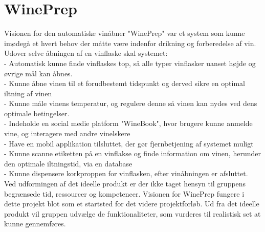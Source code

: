 \section{WinePrep}
Visionen for den automatiske vinåbner "WinePrep" var et system som kunne imødegå et hvert behov der måtte være indenfor drikning og forberedelse af vin. \\
Udover selve åbningen af en vinflaske skal systemet:\\
- Automatisk kunne finde vinflaskes top, så alle typer vinflasker uanset højde og øvrige mål kan åbnes.\\ 
- Kunne åbne vinen til et forudbestemt tidspunkt og derved sikre en optimal iltning af vinen\\
- Kunne måle vinens temperatur, og regulere denne så vinen kan nydes ved dens optimale betingelser.\\
- Indeholde en social medie platform "WineBook", hvor brugere kunne anmelde vine, og interagere med andre vinelskere\\
- Have en mobil applikation tilsluttet, der gør fjernbetjening af systemet muligt\\
- Kunne scanne etiketten på en vinflakse og finde information om vinen, herunder den optimale iltningstid, via en database\\
- Kunne dispensere korkproppen for vinflasken, efter vinåbningen er afsluttet.\\

Ved udformingen af det ideelle produkt er der ikke taget hensyn til gruppens begrænsede tid, ressourcer og kompetencer. Visionen for WinePrep fungere
i dette projekt blot som et startsted for det videre projektforløb. Ud fra det ideelle produkt vil gruppen udvælge de funktionaliteter, som vurderes til realistisk
set at kunne gennemføres.
